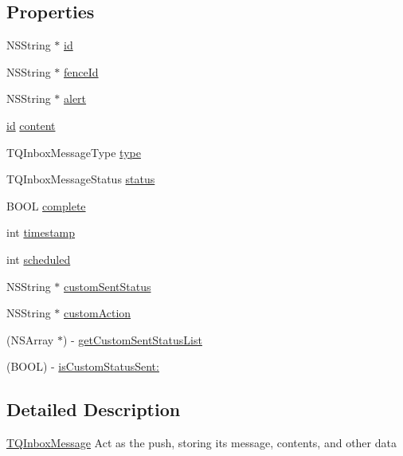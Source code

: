 \subsection*{Properties}
\begin{DoxyCompactItemize}
\item 
N\+S\+String $\ast$ \hyperlink{interface_t_q_inbox_message_a21a1990209c33c87dea6e82fb9878a29}{id}
\item 
N\+S\+String $\ast$ \hyperlink{interface_t_q_inbox_message_a167f2aee91be99c0ce08f980b80a0dba}{fence\+Id}
\item 
N\+S\+String $\ast$ \hyperlink{interface_t_q_inbox_message_a0fdd562c5d3ee1dba53743f893cadb36}{alert}
\item 
\hyperlink{interface_t_q_inbox_message_a21a1990209c33c87dea6e82fb9878a29}{id} \hyperlink{interface_t_q_inbox_message_a789f1e5b46d3121f8bbaaa69b05948fe}{content}
\item 
T\+Q\+Inbox\+Message\+Type \hyperlink{interface_t_q_inbox_message_a0095078f27cb8ac50a0306b83ef86ddc}{type}
\item 
T\+Q\+Inbox\+Message\+Status \hyperlink{interface_t_q_inbox_message_aef995a499d691cd27c255f59d68ec829}{status}
\item 
B\+O\+O\+L \hyperlink{interface_t_q_inbox_message_a1c0241c9106a9e9a19df35ad38d366ce}{complete}
\item 
int \hyperlink{interface_t_q_inbox_message_abd94ee3e5c563ce6a21fde6354c7337e}{timestamp}
\item 
int \hyperlink{interface_t_q_inbox_message_ad3ce8614fde9e7464af00f76bb59d685}{scheduled}
\item 
N\+S\+String $\ast$ \hyperlink{interface_t_q_inbox_message_a733ac6a53d04d9f8844438eae605cb76}{custom\+Sent\+Status}
\item 
N\+S\+String $\ast$ \hyperlink{interface_t_q_inbox_message_a473ac00dc8ef24707a418d3b480068b3}{custom\+Action}
\item 
(N\+S\+Array $\ast$) -\/ \hyperlink{interface_t_q_inbox_message_a53addd7d3427651e217fa76d8af3fee4}{get\+Custom\+Sent\+Status\+List}
\item 
(B\+O\+O\+L) -\/ \hyperlink{interface_t_q_inbox_message_a2f5a0d995823574eebbc87ab4f24fc83}{is\+Custom\+Status\+Sent\+:}
\end{DoxyCompactItemize}


\subsection{Detailed Description}
\hyperlink{interface_t_q_inbox_message}{T\+Q\+Inbox\+Message} Act as the push, storing it\textquotesingle{}s message, contents, and other data 


